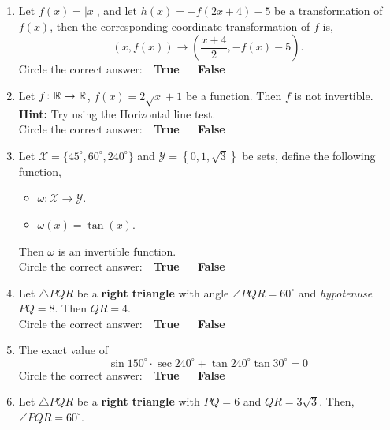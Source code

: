 \documentclass[12pt]{article} %
\begin{document}
\begin{qstn}
\begin{enumerate}
    \item Let $f(x) = \left|x\right|$, and let $h(x) = -f(2x + 4) - 5$ be a transformation of $f(x)$, then the
      corresponding coordinate transformation of $f$ is,
       \[
           \left( x,f(x) \right)  \longrightarrow \left( \frac{x + 4}{2}, -f(x) - 5 \right) 
      .\] 
      Circle the correct answer: \,\, \textbf{True} \,\,\,\,\,\, \textbf{False}

    \item Let $f \colon \mathbb R \to \mathbb R$, $f(x) = 2\sqrt{x} + 1$ be a function. Then $f$ is not invertible. \\
      \textbf{Hint: }Try using the Horizontal line test.\\
      Circle the correct answer: \,\, \textbf{True} \,\,\,\,\,\, \textbf{False}

      \newpage

    \item Let $ \mathcal{X} = \{45^{\circ}, 60^{\circ}, 240^{\circ}\} $ and 
      $ \mathcal{Y} = \left\{0,1,\sqrt{3} \right\} $ be sets, define the
            following function, 
            \begin{itemize}
              \item $\mathcal{\omega} \colon \mathcal{X} \to \mathcal{Y}$.
              \item $\mathcal{\omega}(x) = \tan(x)$.
            \end{itemize}
            Then $\omega$ is an invertible function.\\
          Circle the correct answer: \,\, \textbf{True} \,\,\,\,\,\, \textbf{False}

    \item Let $\triangle PQR$ be a \textbf{right triangle} with angle $\angle PQR = 60^{\circ}$ and 
        \textit{hypotenuse} $PQ = 8$. Then $QR = 4$.\\
          Circle the correct answer: \,\, \textbf{True} \,\,\,\,\,\, \textbf{False}

    \item The exact value of 
      \[ 
        \sin 150^{\circ} \cdot \sec 240^{\circ} + \tan 240^{\circ}\tan 30^{\circ} = 0
      \]
      Circle the correct answer: \,\, \textbf{True} \,\,\,\,\,\, \textbf{False}

    \item Let $\triangle PQR$ be a \textbf{right triangle} with $PQ = 6$ and $QR = 3\sqrt{3}$. Then, $\angle PQR = 60^{\circ}$.
      \begin{center}
\end{center}
\end{enumerate}
\end{qstn}
\end{document}
